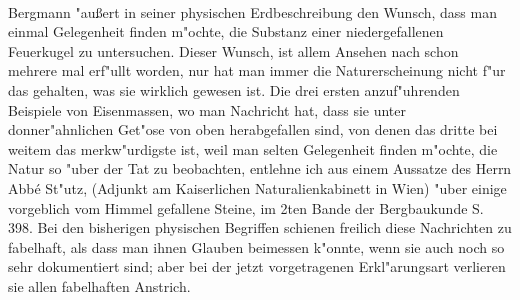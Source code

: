 \documentclass[a4paper, 11pt, oneside, polutonikogreek, german]{article}
\begin{document}
\paragraph{}
Bergmann "außert in seiner physischen Erdbeschreibung den Wunsch, dass man einmal Gelegenheit finden m"ochte, die Substanz einer niedergefallenen Feuerkugel zu untersuchen. Dieser Wunsch, ist allem Ansehen nach schon mehrere mal erf"ullt worden, nur hat man immer die Naturerscheinung nicht f"ur das gehalten, was sie wirklich gewesen ist. Die drei ersten anzuf"uhrenden Beispiele von Eisenmassen, wo man Nachricht hat, dass sie unter donner"ahnlichen Get"ose von oben herabgefallen sind, von denen das dritte bei weitem das merkw"urdigste ist, weil man selten Gelegenheit finden m"ochte, die Natur so "uber der Tat zu beobachten, entlehne ich aus einem Aussatze des Herrn Abbé St"utz, (Adjunkt am Kaiserlichen Naturalienkabinett in Wien) "uber einige vorgeblich vom Himmel gefallene Steine, im 2ten Bande der Bergbaukunde S. 398. Bei den bisherigen physischen Begriffen schienen freilich diese Nachrichten zu fabelhaft, als dass man ihnen Glauben beimessen k"onnte, wenn sie auch noch so sehr dokumentiert sind; aber bei der jetzt vorgetragenen Erkl"arungsart verlieren sie allen fabelhaften Anstrich.
\end{document}
